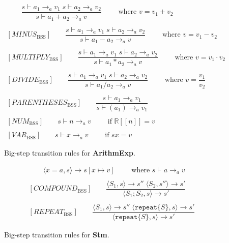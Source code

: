 \begin{figure}[htbp]
	\centering
	\begin{gather*}
		[PLUS_\text{BSS}] 
		\qquad \dfrac
		{s \vdash a_1 \rightarrow_a v_1 \; s \vdash a_2 \rightarrow_a v_2}
		{s \vdash a_1 + a_2 \rightarrow_a v}
		\qquad \text{ where }v = v_1 + v_2
		\\
		\\
		[MINUS_\text{BSS}] 
		\qquad \dfrac
		{s \vdash a_1 \rightarrow_a v_1 \; s \vdash a_2 \rightarrow_a v_2}
		{s \vdash a_1 - a_2 \rightarrow_a v}
		\qquad \text{ where }v = v_1 - v_2
		\\
		\\
		[MULTIPLY_\text{BSS}] 
		\qquad \dfrac
		{s \vdash a_1 \rightarrow_a v_1 \; s \vdash a_2 \rightarrow_a v_2}
		{s \vdash a_1 * a_2 \rightarrow_a v}
		\qquad \text{ where }v = v_1 \cdot v_2
		\\
		\\
		[DIVIDE_\text{BSS}] 
		\qquad \dfrac
		{s \vdash a_1 \rightarrow_a v_1 \; s \vdash a_2 \rightarrow_a v_2}
		{s \vdash a_1 / a_2 \rightarrow_a v}
		\qquad \text{ where }v = \dfrac{v_1}{v_2}
		\\
		\\
		[PARENTHESES_\text{BSS}] 
		\qquad \dfrac
		{s \vdash a_1 \rightarrow_a v_1}
		{s \vdash (a_1) \rightarrow_a v_1}
		\\
		\\
		[NUM_\text{BSS}] 
		\qquad s \vdash n \rightarrow_a v
		\qquad \text{ if } \mathbb{R}[\![n]\!] = v
		\\
		\\
		[VAR_\text{BSS}] 
		\qquad s \vdash x \rightarrow_a v
		\qquad \text{ if } sx = v
	\end{gather*}
	\caption{Big-step transition rules for \textbf{ArithmExp}.}
	\label{fig:BssArithm}
\end{figure}

\begin{figure}[htbp]
	\centering
	\begin{gather*}
		[ASSIGNMENT_\text{BSS}] 
		\qquad \langle x=a,s\rangle \rightarrow s[x\mapsto v]
		\qquad \text{ where }s\vdash a \rightarrow_a v
		\\
		\\
		[COMPOUND_\text{BSS}] 
		\qquad \dfrac
		{\langle S_1, s\rangle \rightarrow s'' \;\langle S_2, s''\rangle \rightarrow s'}
		{\langle S_1;S_2,s\rangle\rightarrow s'}
		\\
		\\
		[REPEAT_\text{BSS}] 
		\qquad \dfrac
		{\langle S_1, s\rangle \rightarrow s'' \;\langle \texttt{repeat} \{S\}, s\rangle \rightarrow s'}
		{\langle \texttt{repeat} \{S\}, s\rangle\rightarrow s'}
	\end{gather*}
	\caption{Big-step transition rules for \textbf{Stm}.}
	\label{fig:BssStm}
\end{figure}